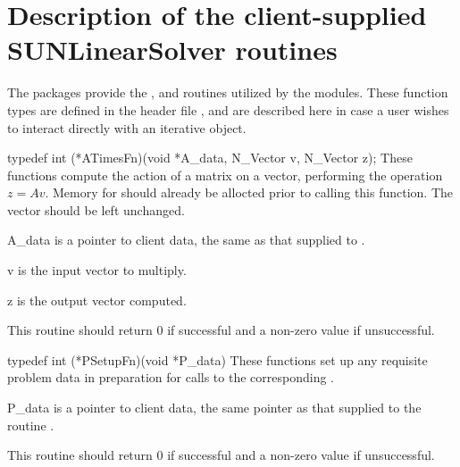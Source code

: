 \section{Description of the client-supplied SUNLinearSolver routines}\label{ss:sunlinsol_clientsupplied}

The {\sundials} packages provide the , 
and  routines utilized by the {\sunlinsol} modules.  These
function types are defined in the header
file , and are described here in
case a user wishes to interact directly with an iterative {\sunlinsol}
object. 



{
  typedef int (*ATimesFn)(void *A\_data, N\_Vector v, N\_Vector z);
}
{
  These functions compute the action of a matrix on a vector,
  performing the operation $z = Av$.  Memory for  should already be
  allocted prior to calling this function.  The vector  should
  be left unchanged.  
}
{
  \begin{args}
  \item[A\_data]
    is a pointer to client data, the same as that supplied to .
  \item[v]
    is the input vector to multiply.
  \item[z]
    is the output vector computed.
  \end{args}
}
{  
  This routine should return 0 if successful and a         
  non-zero value if unsuccessful.
}
{
}



{
  typedef int (*PSetupFn)(void *P\_data)
}
{
  These functions set up any requisite problem data in preparation
  for calls to the corresponding . 
}
{
  \begin{args}
  \item[P\_data]
    is a pointer to client data, the same pointer as that supplied to the routine 
    .
  \end{args}
}
{  
  This routine should return 0 if successful and a non-zero value if unsuccessful. 
}
{
}


